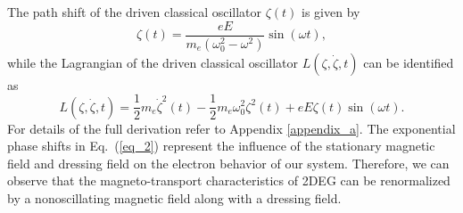 The path shift of the driven classical oscillator $\zeta(t)$ is given by
\begin{equation} \label{eq_4}
  \zeta(t) = \frac{eE}{m_e(\omega_0^2 - \omega^2)}\sin(\omega t),
\end{equation}
while the Lagrangian of the driven classical oscillator $L(\zeta,\dot{\zeta},t)$ can be identified as
\begin{equation} \label{eq_5}
  L(\zeta,\dot{\zeta},t) = \frac{1}{2} m_e\dot{\zeta}^2(t) - \frac{1}{2}m_e\omega_0^2 \zeta^2(t) + eE\zeta(t) \sin(\omega t).
\end{equation}
For details of the full derivation refer to Appendix \ref{appendix_a}.
The exponential phase shifts in Eq.~(\ref{eq_2}) represent the influence of the stationary magnetic field and dressing field on the electron behavior of our system. Therefore, we can observe that the magneto-transport characteristics of 2DEG can be renormalized by a nonoscillating magnetic field along with a dressing field.
